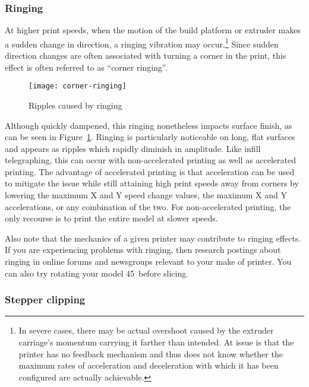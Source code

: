 \subsubsection{Ringing} \label{sec:ringing}

At higher print speeds, when the motion of the build platform or
extruder makes a sudden change in direction, a ringing vibration may
occur.\footnote{In severe cases, there may be actual overshoot caused
by the extruder carriage's momentum carrying it farther than intended.
At issue is that the printer has no feedback mechanism and thus
does not know whether the maximum rates of acceleration and deceleration with which it
has been configured are actually achievable.}  Since
sudden direction changes are often associated with turning a corner in
the print, this effect is often referred to as ``\gls{corner
ringing}''.

\begin{figure}[!htbp]
  \centering
    \texttt{[image: corner-ringing]}
    \caption{Ripples caused by ringing}
  \label{fig:ringing}
\end{figure}

Although quickly dampened, this ringing nonetheless impacts surface
finish, as can be seen in Figure~\ref{fig:ringing}. Ringing is
particularly noticeable on long, flat surfaces and appears as ripples
which rapidly diminish in amplitude. Like infill telegraphing, this
can occur with non-accelerated printing as well as accelerated
printing. The advantage of accelerated printing is that acceleration
can be used to mitigate the issue while still attaining high print
speeds away from corners by lowering the maximum X and Y speed change
values, the maximum X and Y accelerations, or any combination of the
two. For non-accelerated printing, the only recourse is to print the
entire model at slower speeds.

Also note that the mechanics of a given printer may contribute to ringing
effects.  If you are experiencing problems with ringing, then research
postings about ringing in online forums and newsgroups relevant to your
make of printer.  You can also try rotating your model 45\textdegree\ before slicing.

\subsubsection{Stepper clipping} \label{src:clipping}

